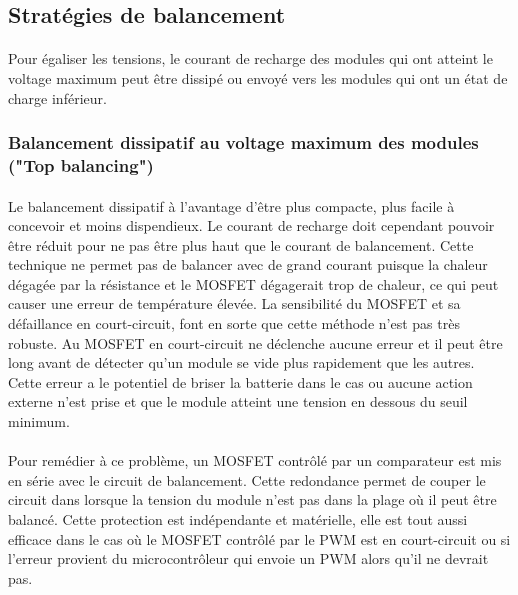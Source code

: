 


\subsection*{Stratégies de balancement}
\paragraph*{}
Pour égaliser les tensions, le courant de recharge des modules qui ont atteint le voltage maximum peut être dissipé ou envoyé vers les modules qui ont un état de charge inférieur. 

\subsubsection*{Balancement dissipatif au voltage maximum des modules ("Top balancing")}
\paragraph*{}
Le balancement dissipatif à l'avantage d'être plus compacte, plus facile à concevoir et moins dispendieux. Le courant de recharge doit cependant pouvoir être réduit pour ne pas être plus haut que le courant de balancement. Cette technique ne permet pas de balancer avec de grand courant puisque la chaleur dégagée par la résistance et le MOSFET dégagerait trop de chaleur, ce qui peut causer une erreur de température élevée. La sensibilité du MOSFET et sa défaillance en court-circuit, font en sorte que cette méthode n'est pas très robuste. Au MOSFET en court-circuit ne déclenche aucune erreur et il peut être long avant de détecter qu'un module se vide plus rapidement que les autres. Cette erreur a le potentiel de briser la batterie dans le cas ou aucune action externe n'est prise et que le module atteint une tension en dessous du seuil minimum.

\paragraph*{}
Pour remédier à ce problème, un MOSFET contrôlé par un comparateur est mis en série avec le circuit de balancement. Cette redondance permet de couper le circuit dans lorsque la tension du module n'est pas dans la plage où il peut être balancé. Cette protection est indépendante et matérielle, elle est tout aussi efficace dans le cas où le MOSFET contrôlé par le PWM est en court-circuit ou si l'erreur provient du microcontrôleur qui envoie un PWM alors qu'il ne devrait pas.

